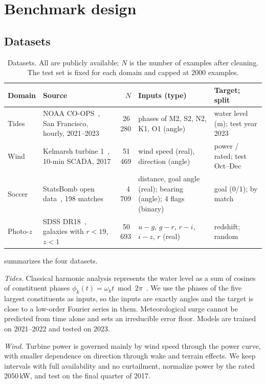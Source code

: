\documentclass[11pt,letterpaper]{article}
\begin{document}
\section{Benchmark design}

\subsection{Datasets}

\begin{table}[t]
\centering\small
\caption{\label{tab:data}Datasets. All are publicly available; $N$ is the number of examples
after cleaning. The test set is fixed for each domain and capped at 2000 examples.}
\begin{tabular}{@{}l>{\raggedright}p{3.9cm}r>{\raggedright}p{4.3cm}>{\raggedright\arraybackslash}p{2.9cm}@{}}
\toprule
Domain & Source & $N$ & Inputs (type) & Target; split \\
\midrule
Tides & NOAA CO-OPS~\cite{noaa_coops}, San Francisco, hourly, 2021--2023 & 26\,280
  & phases of M2, S2, N2, K1, O1 (angle) & water level (m); test year 2023 \\
Wind & Kelmarsh turbine 1~\cite{kelmarsh}, 10-min SCADA, 2017 & 51\,469
  & wind speed (real), direction (angle) & power / rated; test Oct--Dec \\
Soccer & StatsBomb open data~\cite{statsbomb_open}, 198 matches & 4\,709
  & distance, goal angle (real); bearing (angle); 4 flags (binary) & goal (0/1); by match \\
Photo-$z$ & SDSS DR18~\cite{almeida2023dr18}, galaxies with $r<19$, $z<1$ & 50\,693
  & $u{-}g$, $g{-}r$, $r{-}i$, $i{-}z$, $r$ (real) & redshift; random \\
\end{tabular}
\end{table}

 summarizes the four datasets.

\emph{Tides.} Classical harmonic analysis represents the water level as a sum of cosines of
constituent phases $\phi_k(t) = \omega_k t \bmod 2\pi$~\cite{pawlowicz2002ttide,codiga2011utide}.
We use the phases of the five largest constituents as inputs, so the inputs are exactly angles
and the target is close to a low-order Fourier series in them. Meteorological surge cannot be
predicted from time alone and sets an irreducible error floor. Models are trained on 2021--2022
and tested on 2023.

\emph{Wind.} Turbine power is governed mainly by wind speed through the power curve, with
smaller dependence on direction through wake and terrain effects. We keep intervals with full
availability and no curtailment, normalize power by the rated 2050\,kW, and test on the final
quarter of 2017.
\end{document}
